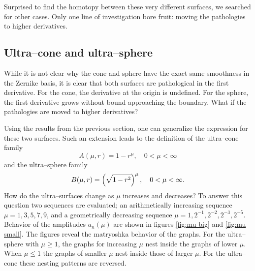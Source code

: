 \documentclass[preprint,12pt]{elsarticle}
\begin{document}
Surprised to find the homotopy between these very different surfaces, we searched for other cases. Only one line of investigation bore fruit: moving the pathologies to higher derivatives.

\subsection{Ultra--cone and ultra--sphere}
While it is not clear why the cone and sphere have the exact same smoothness in the Zernike basis, it is clear that both surfaces are pathological in the first derivative. For the cone, the derivative at the origin is undefined. For the sphere, the first derivative grows without bound approaching the boundary. What if the pathologies are moved to higher derivatives?

Using the results from the previous section, one can generalize the expression for these two surfaces. Such an extension leads to the definition of the ultra--cone family
\begin{equation}
  A(\mu,r) = 1-r^{\mu}, \quad 0<\mu<\infty
  \label{eq:mu:cone}
\end{equation}
and the ultra--sphere family
\begin{equation}
  B(\mu,r) = \left( \sqrt{1-r^{2}} \right)^{\mu}, \quad 0<\mu<\infty.
  \label{eq:mu:sphere}
\end{equation}
How do the ultra--surfaces change as $\mu$ increases and decreases? To answer this question two sequences are evaluated; an arithmetically increasing sequence $\mu={1,3,5,7,9}$, and a geometrically decreasing sequence $\mu={1,2^{-1},2^{-2},2^{-3},2^{-5}}$. Behavior of the amplitudes $a_{n}(\mu)$ are shown in figures \ref{fig:mu big} and \ref{fig:mu small}. The figures reveal the matryoshka behavior of the graphs. For the ultra--sphere with $\mu\ge1$, the graphs for increasing $\mu$ nest inside the graphs of lower $\mu$. When $\mu \le1$ the graphs of smaller $\mu$ nest inside those of larger $\mu$. For the ultra--cone these nesting patterns are reversed.
\end{document}
